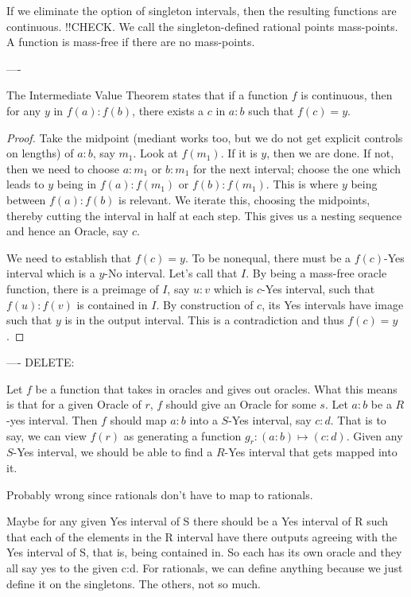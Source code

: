 \documentclass[12pt]{article}
\theoremstyle{remark}
\begin{document}
If we eliminate the option of singleton intervals, then the resulting functions are continuous. !!CHECK. We call the singleton-defined rational points mass-points. A function is mass-free if there are no mass-points. 

----

The Intermediate Value Theorem states that if a function $f$ is continuous, then for any $y$ in $f(a):f(b)$, there exists a $c$ in $a:b$ such that $f(c) = y$. 

\begin{proof}
Take the midpoint (mediant works too, but we do not get explicit controls on lengths) of $a:b$, say $m_1$. Look at $f(m_1)$. If it is $y$, then we are done. If not, then we need to choose $a:m_1$ or $b:m_1$ for the next interval; choose the one which leads to $y$ being in $f(a):f(m_1)$ or $f(b):f(m_1)$. This is where $y$ being between $f(a):f(b)$ is relevant.  We iterate this, choosing the midpoints, thereby cutting the interval in half at each step. This gives us a nesting sequence and hence an Oracle, say $c$. 

We need to establish that $f(c)=y$. To be nonequal, there must be a $f(c)$-Yes interval which is a $y$-No interval. Let's call that $I$. By being a mass-free oracle function, there is a preimage of $I$, say $u:v$ which is $c$-Yes interval, such that $f(u):f(v)$ is contained in $I$. By construction of $c$, its Yes intervals have image such that $y$ is in the output interval. This is a contradiction and thus $f(c)=y$.
\end{proof}


----
DELETE:

Let $f$ be a function that takes in oracles and gives out oracles. What this means is that for a given Oracle of $r$, $f$ should give an Oracle for some $s$. Let $a:b$ be a $R$-yes interval. Then $f$ should map $a:b$ into a $S$-Yes interval, say $c:d$. That is to say, we can view $f(r)$ as generating a function $g_r : (a:b) \mapsto (c:d)$. Given any $S$-Yes interval, we should be able to find a $R$-Yes interval that gets mapped into it. 

Probably wrong since rationals don't have to map to rationals. 

Maybe for any given Yes interval of S there should be a Yes interval of R such that each of the elements in the R interval have there outputs agreeing with the Yes interval of S, that is, being contained in. So each has its own oracle and they all say yes to the given c:d.  For rationals, we can define anything because we just define it on the singletons. The others, not so much. 
\end{document}
